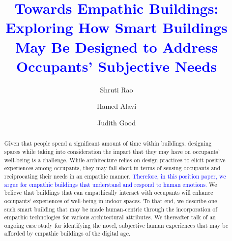 \documentclass [sigconf, review, anonymous] {acmart}
\begin{document}
\newcommand{\blue}[1]{\textcolor{blue}{#1}}

\title{\blue{Towards Empathic Buildings: Exploring How Smart Buildings May Be Designed to Address Occupants’ Subjective Needs}}


\author{Shruti Rao}

\author{Hamed Alavi}

\author{Judith Good}



\renewcommand{\shortauthors}{Rao et al.}

\begin{abstract}
Given that people spend a significant amount of time within buildings, designing spaces while taking into consideration the impact that they may have on occupants’ well-being is a challenge. While architecture relies on design practices to elicit positive experiences among occupants, they may fall short in terms of sensing occupants and reciprocating their needs in an empathic manner. \blue{Therefore, in this position paper, we argue for empathic buildings that understand and respond to human emotions.} We believe that buildings that can empathically interact with occupants will enhance occupants’ experiences of well-being in indoor spaces. To that end, we describe one such smart building that may be made human-centric through the incorporation of empathic technologies for various architectural attributes. We thereafter talk of an ongoing case study for identifying the novel, subjective human experiences that may be afforded by empathic buildings of the digital age. 
\end{abstract}
\end{document}
